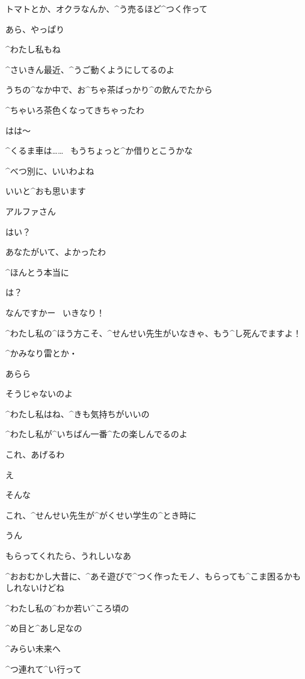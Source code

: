 \Alpha トマトとか、オクラなんか、^{う}{売}るほど^{つく}{作}って

\Sensei あら、やっぱり

\Sensei ^{わたし}{私}もね

\Sensei ^{さいきん}{最近}、^{うご}{動}くようにしてるのよ

\page
\Sensei うちの^{なか}{中}で、お^{ちゃ}{茶}ばっかり^{の}{飲}んでたから

\Sensei ^{ちゃいろ}{茶色}くなってきちゃったわ

\Alpha はは〜

\Sensei ^{くるま}{車}は……
\ もうちょっと^{か}{借}りとこうかな

\Sensei ^{べつ}{別}に、いいわよね

\Alpha いいと^{おも}{思}います

\page[25]
\Sensei アルファさん

\Alpha はい？

\page
\Sensei あなたがいて、よかったわ

\Sensei ^{ほんとう}{本当}に

\Alpha は？

\page
\Alpha なんですかー
\ いきなり！

\Alpha ^{わたし}{私}の^{ほう}{方}こそ、^{せんせい}{先生}がいなきゃ、もう^{し}{死}んでますよ！

\Alpha ^{かみなり}{雷}とか・

\Sensei あらら

\Sensei そうじゃないのよ

\Sensei ^{わたし}{私}はね、^{きも}{気持}ちがいいの

\Sensei ^{わたし}{私}が^{いちばん}{一番}^{たの}{楽}しんでるのよ

\page
\Sensei これ、あげるわ

\Alpha え

\page
\Alpha そんな

\Alpha これ、^{せんせい}{先生}が^{がくせい}{学生}の^{とき}{時}に

\Sensei うん

\Sensei もらってくれたら、うれしいなあ

\Sensei ^{おおむかし}{大昔}に、^{あそ}{遊}びで^{つく}{作}ったモノ、もらっても^{こま}{困}るかもしれないけどね

\Sensei ^{わたし}{私}の^{わか}{若}い^{ころ}{頃}の

\Sensei ^{め}{目}と^{あし}{足}なの

\page
\Sensei ^{みらい}{未来}へ

\Sensei ^{つ}{連}れて^{い}{行}って

